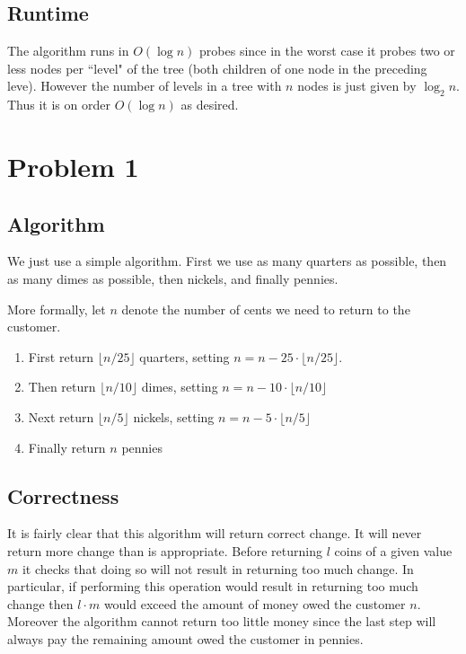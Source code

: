 \documentclass{article}
\begin{document}
\subsection{Runtime}
The algorithm runs in $O(\log{n})$ probes since in the worst case it probes two or less nodes per ``level" of the tree (both children of one node in the preceding leve). However the number of levels in a tree with $n$ nodes is just given by $\log_2{n}$. Thus it is on order $O(\log{n})$ as desired.

\section{Problem 1}

\subsection{Algorithm}
We just use a simple algorithm. First we use as many quarters as possible, then as many dimes as possible, then nickels, and finally pennies.

More formally, let $n$ denote the number of cents we need to return to the customer.

\begin{enumerate}
\item First return $\lfloor n/25\rfloor$ quarters, setting $n=n-25 \cdot \lfloor n/25\rfloor$.
\item Then return $\lfloor n/10\rfloor$ dimes, setting $n=n-10 \cdot \lfloor n/10\rfloor$
\item Next return $\lfloor n/5\rfloor$ nickels, setting $n=n-5 \cdot \lfloor n/5\rfloor$
\item Finally return $n$ pennies
\end{enumerate}

\subsection{Correctness}
It is fairly clear that this algorithm will return correct change. It will never return more change than is appropriate. Before returning $l$ coins of a given value $m$ it checks that doing so will not result in returning too much change. In particular, if performing this operation would result in returning too much change then $l \cdot m$ would exceed the amount of money owed the customer $n$. Moreover the algorithm cannot return too little money since the last step will always pay the remaining amount owed the customer in pennies.
\end{document}
